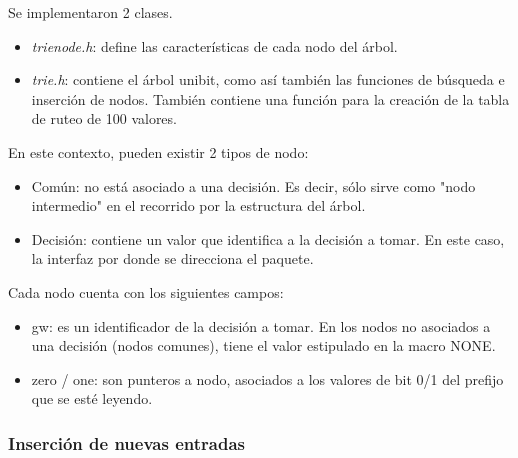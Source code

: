 Se implementaron 2 clases. 

\begin{itemize}
	\item \textit{trienode.h}: define las características de cada nodo del árbol.
	\item \textit{trie.h}: contiene el árbol unibit, como así también las funciones de búsqueda e inserción de nodos. También contiene una función para la creación de la tabla de ruteo de 100 valores.
\end{itemize}


En este contexto, pueden existir 2 tipos de nodo:

\begin{itemize}
	\item Común: no está asociado a una decisión. Es decir, sólo sirve como "nodo intermedio" en el recorrido por la estructura del árbol.
	\item Decisión: contiene un valor que identifica a la decisión a tomar. En este caso, la interfaz por donde se direcciona el paquete.
\end{itemize}

Cada nodo cuenta con los siguientes campos:
\begin{itemize}
	\item gw: es un identificador de la decisión a tomar. En los nodos no asociados a una decisión (nodos comunes), tiene el valor estipulado en la macro NONE.
    \item zero / one: son punteros a nodo, asociados a los valores de bit 0/1 del prefijo que se esté leyendo.

\end{itemize}

\subsubsection{Inserción de nuevas entradas}

